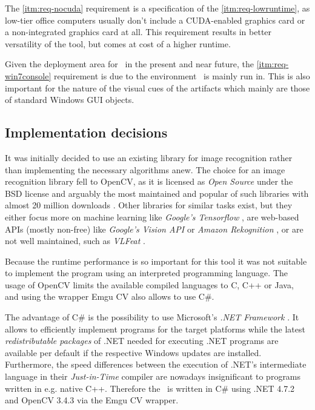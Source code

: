 The \ref{itm:req-nocuda} requirement is a specification of the \ref{itm:req-lowruntime}, as low-tier office computers usually don't include a CUDA-enabled graphics card or a non-integrated graphics card at all. This requirement results in better versatility of the tool, but comes at cost of a higher runtime.

Given the deployment area for \ape~in the present and near future, the \ref{itm:req-win7console} requirement is due to the environment \ape~is mainly run in. This is also important for the nature of the visual cues of the artifacts which mainly are those of standard Windows GUI objects.

\subsection{Implementation decisions}

It was initially decided to use an existing library for image recognition rather than implementing the necessary algorithms anew. The choice for an image recognition library fell to OpenCV, as it is licensed as \emph{Open Source} under the BSD license and arguably the most maintained and popular of such libraries with almost 20 million downloads \cite{opencv_downloads}. Other libraries for similar tasks exist, but they either focus more on machine learning like \emph{Google's Tensorflow} \cite{tensorflow}, are web-based APIs (mostly non-free) like \emph{Google's Vision API} \cite{vision_api} or \emph{Amazon Rekognition} \cite{rekognition}, or are not well maintained, such as \emph{VLFeat} \cite{vlfeat}.

Because the runtime performance is so important for this tool it was not suitable to implement the program using an interpreted programming language. The usage of OpenCV limits the available compiled languages to C, C++ or Java, and using the wrapper Emgu CV also allows to use C\#.

The advantage of C\# is the possibility to use Microsoft's \emph{.NET Framework} \cite{dotnet4_7_2}. It allows to efficiently implement programs for the target platforms while the latest \emph{redistributable packages} of .NET needed for executing .NET programs are available per default if the respective Windows updates are installed. Furthermore, the speed differences between the execution of .NET's intermediate language in their \emph{Just-in-Time} compiler are nowadays insignificant to programs written in e.g. native C++. Therefore the \vd~is written in C\# using .NET 4.7.2 and OpenCV 3.4.3 via the Emgu CV wrapper.

